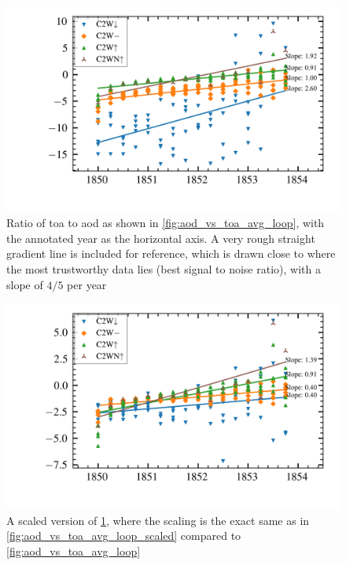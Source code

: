 \documentclass[twocol]{ametsocV5}
\begin{document}
\begin{figure}
  \begin{center}
    \includegraphics[width=0.95\linewidth]{figures/aod_vs_toa_avg_loop_ratio.png}
  \end{center}
  \caption{
    Ratio of \acrshort{toa} to \acrshort{aod} as shown in
    \cref{fig:aod_vs_toa_avg_loop}, with the annotated year as the horizontal axis. A
    very rough straight gradient line is included for reference, which is drawn close to
    where the most trustworthy data lies (best signal to noise ratio), with a slope of
    \(4/5\) per year
  }%
  \label{fig:aod_vs_toa_avg_loop_ratio}
\end{figure}

\begin{figure}
  \begin{center}
    \includegraphics[width=0.95\linewidth]{figures/aod_vs_toa_avg_loop_ratio_scaled.png}
  \end{center}
  \caption{
    A scaled version of \cref{fig:aod_vs_toa_avg_loop_ratio}, where the scaling is the
    exact same as in \cref{fig:aod_vs_toa_avg_loop_scaled} compared to
    \cref{fig:aod_vs_toa_avg_loop}
  }%
  \label{fig:aod_vs_toa_avg_loop_ratio_scaled}
\end{figure}
\end{document}

